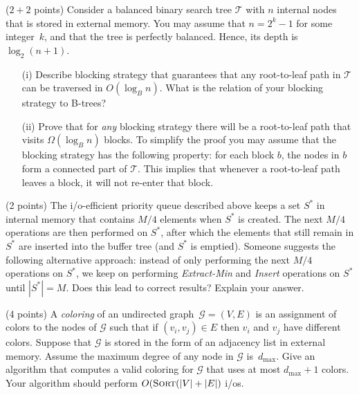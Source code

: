 \documentclass{article}
\newcommand{\G}{\ensuremath{\mathcal{G}}}
\newcommand{\tree}{\ensuremath{\mathcal{T}}}
\newcommand{\io}{{\sc i/o}\xspace}
\newcommand{\ios}{{\io}s\xspace}
\newcommand{\sort}{\mbox{\sc Sort}}
\newcounter{rcounter}
\newenvironment{rlist}%
{\begin{list}{\setnr-\arabic{rcounter}}{\usecounter{rcounter}}}{\end{list}}
\begin{document}
    \begin{rlist}
        
        \item ($2 + 2$ points)
        Consider a balanced binary search tree $\tree$ with $n$ internal nodes that is stored in external memory.
        You may assume that $n=2^k-1$ for some integer~$k$, and that the tree is perfectly balanced.
        Hence, its depth is~$\log_2 (n+1)$.
        \begin{enumerate}
            \item[(i)]
            Describe blocking strategy that guarantees that any root-to-leaf
            path in $\tree$ can be traversed in $O(\log_B n)$. What is the relation of your blocking
            strategy to B-trees?
            \item[(ii)]
            Prove that for \emph{any} blocking strategy there will be a root-to-leaf path that
            visits $\Omega(\log_B n)$ blocks. To simplify the proof you may assume that
            the blocking strategy has the following property: for each block $b$, the nodes in
            $b$ form a connected part of $\tree$. This implies that whenever a root-to-leaf path
            leaves a block, it will not re-enter that block. 
        \end{enumerate}
        
        \item (2 points)
        The \io-efficient priority queue described above keeps a set $S^*$ in internal memory
        that contains $M/4$ elements when $S^*$ is created. The next $M/4$ operations are then
        performed on $S^*$, after which the elements that still remain in $S^*$ are inserted
        into the buffer tree (and $S^*$ is emptied).
        Someone suggests the following alternative approach: instead of only performing
        the next $M/4$ operations on $S^*$, we keep on performing
        \emph{Extract-Min} and \emph{Insert} operations on $S^*$ until $|S^*|=M$.
        Does this lead to correct results? Explain your answer.
        
        \item (4 points)
        A \emph{coloring} of an undirected graph~$\G=(V,E)$ is an assignment of colors to
        the nodes of $\G$ such that if $(v_i,v_j)\in E$ then $v_i$ and $v_j$ have different colors.
        Suppose that $\G$ is stored in the form of an adjacency list in external memory.
        Assume the maximum degree of any node in $\G$ is~$d_{\max}$. Give an algorithm that computes
        a valid coloring for $\G$ that uses at most $d_{\max}+1$ colors. Your algorithm should perform
        $O(\sort(|V|+|E|)$ \ios.
        
    \end{rlist}
    
\end{document}
